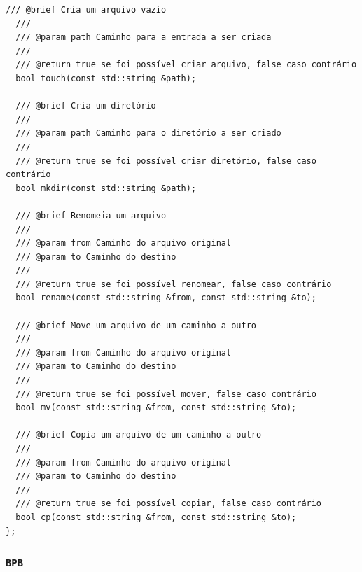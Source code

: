 \documentclass[
    12pt,				%
    oneside,   	        %
    a4paper,			%
    english,			%
    french,				%
    spanish,			%
    brazil,				%
    ]{pacotes/abntex2}
\begin{document}
\begin{lstlisting}[caption={Classe que expõe as interfaces de interação com o sistema de arquivos}, label={lst:fatfs}]
  /// @brief Cria um arquivo vazio
  ///
  /// @param path Caminho para a entrada a ser criada
  ///
  /// @return true se foi possível criar arquivo, false caso contrário
  bool touch(const std::string &path);

  /// @brief Cria um diretório
  ///
  /// @param path Caminho para o diretório a ser criado
  ///
  /// @return true se foi possível criar diretório, false caso contrário
  bool mkdir(const std::string &path);

  /// @brief Renomeia um arquivo
  ///
  /// @param from Caminho do arquivo original
  /// @param to Caminho do destino
  ///
  /// @return true se foi possível renomear, false caso contrário
  bool rename(const std::string &from, const std::string &to);

  /// @brief Move um arquivo de um caminho a outro
  ///
  /// @param from Caminho do arquivo original
  /// @param to Caminho do destino
  ///
  /// @return true se foi possível mover, false caso contrário
  bool mv(const std::string &from, const std::string &to);

  /// @brief Copia um arquivo de um caminho a outro
  ///
  /// @param from Caminho do arquivo original
  /// @param to Caminho do destino
  ///
  /// @return true se foi possível copiar, false caso contrário
  bool cp(const std::string &from, const std::string &to);
};
\end{lstlisting}

\subsubsection{\texttt{BPB}}
\label{subsubsec:bpb}
\end{document}
